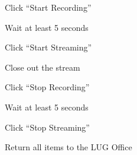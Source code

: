 \documentclass[12pt,letterpaper,oneside]{article}
\newenvironment{checklist}{%
	\begin{list}{}{}%
	\let\olditem\item
	\renewcommand\item{\olditem[$\Box$] }
	}{%
	\end{list}
}
\begin{document}
\begin{enumerate}
\begin{checklist}
  \item Click ``Start Recording''
  \item Wait at least 5 seconds
  \item Click ``Start Streaming''
  \end{checklist}
\item Close out the stream
  \begin{checklist}
  \item Click ``Stop Recording''
  \item Wait at least 5 seconds
  \item Click ``Stop Streaming''
  \item Return all items to the LUG Office
  \end{checklist}
\end{enumerate}
\end{document}
